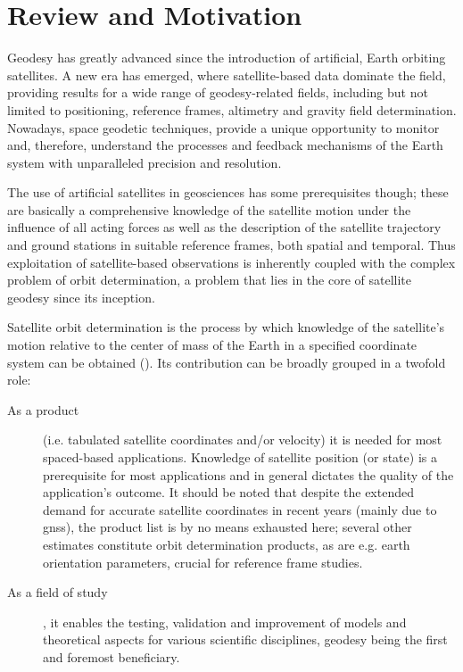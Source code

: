 \section{Review and Motivation}\label{ssec:review-and-motvation}

Geodesy has greatly advanced since the introduction of artificial, Earth orbiting 
satellites. A new era has emerged, where satellite-based data dominate the field, 
providing results for a wide range of geodesy-related fields, including but not 
limited to positioning, reference frames, altimetry and gravity field determination. 
Nowadays, space geodetic techniques, provide a unique opportunity to monitor and, 
therefore, understand the processes and feedback mechanisms of the Earth 
system with unparalleled precision and resolution.
\iffalse (\cite{Jin2013}). \fi

The use of artificial satellites in geosciences has some prerequisites though; 
these are basically a comprehensive knowledge of the satellite motion under 
the influence of all acting forces as well as the description of the satellite
trajectory and ground stations in suitable reference frames, both spatial and 
temporal. Thus exploitation of satellite-based observations is inherently 
coupled with the complex problem of orbit determination, a problem that lies in 
the core of satellite geodesy since its inception.

Satellite orbit determination is the process by which knowledge of the satellite’s
motion relative to the center of mass of the Earth in a specified coordinate 
system can be obtained (\cite{Tapley2004}). Its contribution can be broadly
grouped in a twofold role:
\begin{description}
    \item[As a product] (i.e. tabulated satellite coordinates and/or velocity) 
    it is needed for most spaced-based applications. Knowledge of satellite 
    position (or state) is a prerequisite for most applications and in general 
    dictates the quality of the application's outcome. It should be noted that 
    despite the extended demand for accurate satellite coordinates in recent 
    years (mainly due to \gls{gnss}), the product list is by no means exhausted here; 
    several other estimates constitute orbit determination products, as are e.g. 
    earth orientation parameters, crucial for reference frame studies.
    \item[As a field of study], it enables the testing, validation and improvement 
    of models and theoretical aspects for various scientific disciplines, 
    geodesy being the first and foremost beneficiary.
\end{description}

